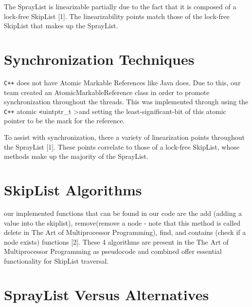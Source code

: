 \documentclass[conference]{IEEEtran}
\begin{document}
The SprayList is linearizable partially due to the fact that it is composed of a lock-free SkipList [1]. The linearizability points match those of the lock-free SkipList that makes up the SprayList.


\section {Synchronization Techniques}


\verb!C++! does not have Atomic Markable References like Java does. Due to this, our team created an AtomicMarkableReference class in order to promote synchronization throughout the threads. This was implemented through using the \verb!C++! atomic \verb!<!uintptr_t \textgreater and setting the least-significant-bit of this atomic pointer to be the mark for the reference.


To assist with synchronization, there a variety of linearization points throughout the SprayList [1]. These points correlate to those of a lock-free SkipList, whose methods make up the majority of the SprayList.

\section {SkipList Algorithms}

our implemented functions that can be found in our code are the add (adding a value into the skiplist), remove(remove a node - note that this method is called delete in  The Art of Multiprocessor Programming), find, and contains (check if a node exists) functions [2]. These 4 algorithms are present in the The Art of Multiprocessor Programming as pseudocode and combined offer essential functionality for SkipList traversal.

\section {SprayList Versus Alternatives}
\end{document}
